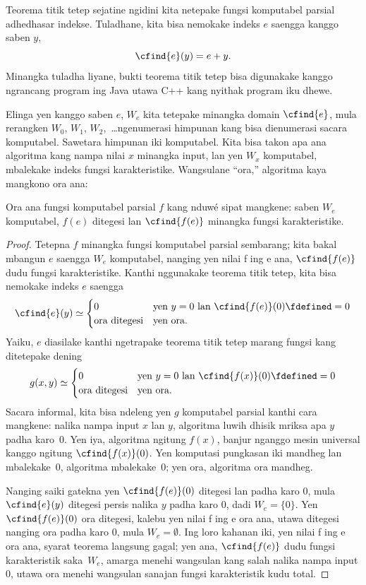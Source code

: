 \documentclass[../../../include/open-logic-section]{subfiles}
\begin{document}

Teorema titik tetep sejatine ngidini kita netepake
fungsi komputabel parsial adhedhasar indekse.
Tuladhane, kita bisa nemokake indeks $e$
saengga kanggo saben $y$,
\[
\cfind{e}(y) = e + y.
\]
Minangka tuladha liyane, bukti teorema titik tetep
bisa digunakake kanggo ngrancang program ing Java
utawa C++ kang nyithak program iku dhewe.

Elinga yen kanggo saben $e$, $W_e$ kita tetepake
minangka domain $\cfind{e}$, mula rerangken $W_0$,
$W_1$, $W_2$,~\dots ngenumerasi himpunan kang
bisa dienumerasi sacara komputabel. Sawetara
himpunan iki komputabel. Kita bisa takon apa ana
algoritma kang nampa nilai $x$ minangka input,
lan yen $W_x$ komputabel, mbalekake indeks
fungsi karakteristike. Wangsulane ``ora,''
algoritma kaya mangkono ora ana:

\begin{thm}
Ora ana fungsi komputabel parsial $f$ kang
nduwé sipat mangkene: saben $W_e$ komputabel,
$f(e)$ ditegesi lan $\cfind{f(e)}$ minangka
fungsi karakteristike.
\end{thm}

\begin{proof}
%
Tetepna $f$ minangka fungsi komputabel parsial
sembarang; kita bakal mbangun $e$ saengga $W_e$
komputabel, nanging yen nilai f ing e ana,
$\cfind{f(e)}$ dudu fungsi karakteristike.
Kanthi nggunakake teorema titik tetep, kita
bisa nemokake indeks $e$ saengga
\[
\cfind{e}(y) \simeq
\begin{cases}
0 & \text{yen $y=0$ lan $\cfind{f(e)}(0) \fdefined = 0$} \\
\text{ora ditegesi} & \text{yen ora.}
\end{cases}
\]
Yaiku, $e$ diasilake kanthi ngetrapake
teorema titik tetep marang fungsi kang
ditetepake dening
\[
g(x,y) \simeq
\begin{cases}
0 & \text{yen $y=0$ lan $\cfind{f(x)}(0) \fdefined = 0$} \\
\text{ora ditegesi} & \text{yen ora.}
\end{cases}
\]
Sacara informal, kita bisa ndeleng yen $g$
komputabel parsial kanthi cara mangkene:
nalika nampa input $x$ lan $y$, algoritma
luwih dhisik mriksa apa $y$ padha
karo~$0$. Yen iya, algoritma ngitung
$f(x)$, banjur nganggo mesin universal
kanggo ngitung $\cfind{f(x)}(0)$.
Yen komputasi pungkasan iki mandheg
lan mbalekake~$0$, algoritma mbalekake~$0$;
yen ora, algoritma ora mandheg.

Nanging saiki gatekna yen $\cfind{f(e)}(0)$
ditegesi lan padha karo $0$, mula
$\cfind{e}(y)$ ditegesi persis nalika $y$
padha karo $0$, dadi $W_e =
\{ 0 \}$. Yen $\cfind{f(e)}(0)$ ora
ditegesi, kalebu yen nilai f ing e ora ana,
utawa ditegesi nanging ora padha karo
$0$, mula $W_e = \emptyset$. Ing loro
kahanan iki, yen nilai f ing e ora ana,
syarat teorema langsung gagal; yen ana,
$\cfind{f(e)}$ dudu fungsi karakteristik
saka~$W_e$, amarga menehi wangsulan
kang salah nalika nampa input $0$, utawa ora menehi wangsulan sanajan fungsi karakteristik kudu total.
\end{proof}
\end{document}

